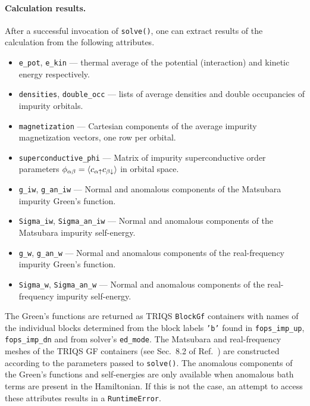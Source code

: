 \documentclass[edipack_sp.tex]{subfiles}
\begin{document}
\paragraph{{\bf Calculation results}.}
After a successful invocation of {\tt solve()}, one can extract results of the 
calculation from the following attributes.
\begin{itemize}
    \item {\tt e\_pot}, {\tt e\_kin} --- thermal average of the potential 
          (interaction) and kinetic energy respectively.
    \item {\tt densities}, {\tt double\_occ} --- lists of average densities and
          double occupancies of impurity orbitals.
    \item {\tt magnetization} --- Cartesian components of the average impurity  
          magnetization vectors, one row per orbital.
    \item {\tt superconductive\_phi} --- Matrix of impurity superconductive
          order parameters
          $\phi_{\alpha\beta} = \langle c_{\alpha\uparrow} c_{\beta\downarrow}\rangle$
          in orbital space.
    \item {\tt g\_iw}, {\tt g\_an\_iw} --- Normal and anomalous components of
          the Matsubara impurity Green's function.
    \item {\tt Sigma\_iw}, {\tt Sigma\_an\_iw} --- Normal and anomalous
          components of the Matsubara impurity self-energy.
    \item {\tt g\_w}, {\tt g\_an\_w} --- Normal and anomalous components of
          the real-frequency impurity Green's function.
    \item {\tt Sigma\_w}, {\tt Sigma\_an\_w} --- Normal and anomalous
          components of the real-frequency impurity self-energy.
\end{itemize}

The Green's functions are returned as TRIQS {\tt BlockGf} containers
with names of the individual blocks determined from the block labels {\tt 'b'}
found in {\tt fops\_imp\_up}, {\tt fops\_imp\_dn} and from solver's
{\tt ed\_mode}. The Matsubara and real-frequency meshes of the TRIQS GF 
containers (see Sec.~8.2 of Ref.~) are constructed
according to the parameters passed to {\tt solve()}.
The anomalous components of the Green's functions and self-energies are only 
available when anomalous bath terms are present in the Hamiltonian.
If this is not the case, an attempt to access these attributes results in a
{\tt RuntimeError}.
\end{document}
